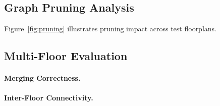 \documentclass[manuscript,screen,review]{acmart}
\begin{document}

\subsection{Graph Pruning Analysis}
\label{subsec:pruning_eval}


Figure~\ref{fig:pruning} illustrates pruning impact across test floorplans.


\subsection{Multi-Floor Evaluation}
\label{subsec:multi_eval}

\paragraph{Merging Correctness.}

\paragraph{Inter-Floor Connectivity.}
\end{document}
